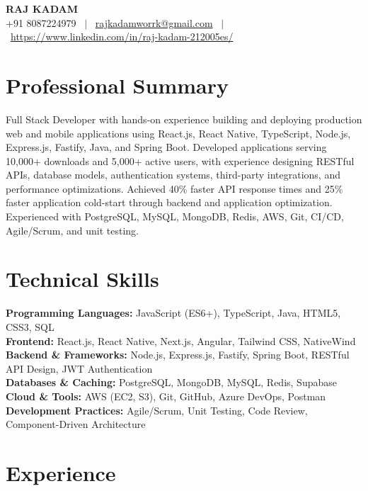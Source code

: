 \documentclass[9pt]{extarticle}
\begin{document}
\begin{center}
  {\LARGE \textbf{RAJ KADAM}}\\[1pt]
  {\small +91 8087224979 \ $|$ \
  \href{mailto:rajkadamworrk@gmail.com}{rajkadamworrk@gmail.com} \ $|$ \
  \href{https://www.linkedin.com/in/raj-kadam-212005es/}{https://www.linkedin.com/in/raj-kadam-212005es/}}
\end{center}
\vspace{-9pt}

\section*{Professional Summary}
Full Stack Developer with hands-on experience building and deploying production web and mobile applications using React.js, React Native, TypeScript, Node.js, Express.js, Fastify, Java, and Spring Boot. Developed applications serving 10,000+ downloads and 5,000+ active users, with experience designing RESTful APIs, database models, authentication systems, third-party integrations, and performance optimizations. Achieved 40\% faster API response times and 25\% faster application cold-start through backend and application optimization. Experienced with PostgreSQL, MySQL, MongoDB, Redis, AWS, Git, CI/CD, Agile/Scrum, and unit testing.
\section*{Technical Skills}
\textbf{Programming Languages:} JavaScript (ES6+), TypeScript, Java, HTML5, CSS3, SQL\\
\textbf{Frontend:} React.js, React Native, Next.js, Angular, Tailwind CSS, NativeWind\\
\textbf{Backend \& Frameworks:} Node.js, Express.js, Fastify, Spring Boot, RESTful API Design, JWT Authentication\\
\textbf{Databases \& Caching:}  PostgreSQL, MongoDB, MySQL, Redis, Supabase\\
\textbf{Cloud \& Tools:} AWS (EC2, S3), Git, GitHub, Azure DevOps, Postman\\
\textbf{Development Practices:} Agile/Scrum, Unit Testing, Code Review, Component-Driven Architecture

\section*{Experience}
\end{document}
